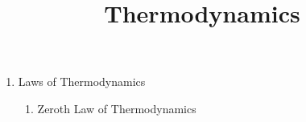 \documentclass{article}
\title{Thermodynamics}
\begin{document}
\maketitle
\begin{enumerate}
	\item Laws of Thermodynamics
	\begin{enumerate}
		\item Zeroth Law of Thermodynamics
	\end{enumerate}
\end{enumerate}
\end{document}
